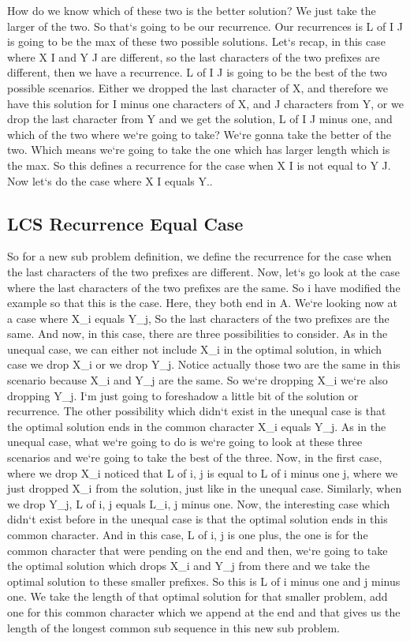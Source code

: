 How do we know which of these two is the better solution? We just take the larger of the two.
So that`s going to be our recurrence.
Our recurrences is L of I J is going to be the max of these two possible solutions.
Let`s recap, in this case where X I and Y J are different, so the last characters of the two prefixes are different, then we have a recurrence.
L of I J is going to be the best of the two possible scenarios.
Either we dropped the last character of X, and therefore we have this solution for I minus one characters of X, and J characters from Y, or we drop the last character from Y and we get the solution, L of I J minus one, and which of the two where we`re going to take? We`re gonna take the better of the two.
Which means we`re going to take the one which has larger length which is the max.
So this defines a recurrence for the case when X I is not equal to Y J\@.
Now let`s do the case where X I equals Y\@..

\subsection{LCS  Recurrence Equal Case}
So for a new sub problem definition, we define the recurrence for the case when the last characters of the two prefixes are different.
Now, let`s go look at the case where the last characters of the two prefixes are the same.
So i have modified the example so that this is the case.
Here, they both end in A\@.
We`re looking now at a case where X\_i equals Y\_j, So the last characters of the two prefixes are the same.
And now, in this case, there are three possibilities to consider.
As in the unequal case, we can either not include X\_i in the optimal solution, in which case we drop X\_i or we drop Y\_j.
Notice actually those two are the same in this scenario because X\_i and Y\_j are the same.
So we`re dropping X\_i we`re also dropping Y\_j.
I`m just going to foreshadow a little bit of the solution or recurrence.
The other possibility which didn`t exist in the unequal case is that the optimal solution ends in the common character X\_i equals Y\_j.
As in the unequal case, what we`re going to do is we`re going to look at these three scenarios and we`re going to take the best of the three.
Now, in the first case, where we drop X\_i noticed that L of i, j is equal to L of i minus one j, where we just dropped X\_i from the solution, just like in the unequal case.
Similarly, when we drop Y\_j, L of i, j equals L\_i, j minus one.
Now, the interesting case which didn`t exist before in the unequal case is that the optimal solution ends in this common character.
And in this case, L of i, j is one plus, the one is for the common character that were pending on the end and then, we`re going to take the optimal solution which drops X\_i and Y\_j from there and we take the optimal solution to these smaller prefixes.
So this is L of i minus one and j minus one.
We take the length of that optimal solution for that smaller problem, add one for this common character which we append at the end and that gives us the length of the longest common sub sequence in this new sub problem.

